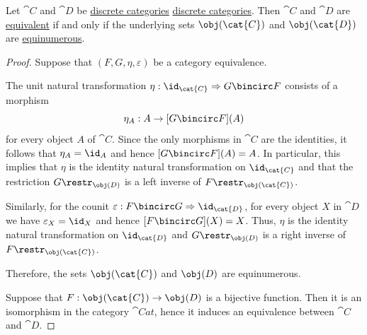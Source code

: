 \begin{proposition}\label{thm:discrete_category_equivalence}
  Let \( \cat{C} \) and \( \cat{D} \) be \hyperref[def:small_category]{discrete categories} \hyperref[def:discrete_category]{discrete categories}. Then \( \cat{C} \) and \( \cat{D} \) are \hyperref[def:category_equivalence]{equivalent} if and only if the underlying sets \( \obj(\cat{C}) \) and \( \obj(\cat{D}) \) are \hyperref[def:equinumerosity]{equinumerous}.
\end{proposition}
\begin{proof}
  \SufficiencySubProof Suppose that \( (F, G, \eta, \varepsilon) \) be a category equivalence.

  The unit natural transformation \( \eta: \id_{\cat{C}} \Rightarrow G \bincirc F \) consists of a morphism
  \begin{equation*}
    \eta_A: A \to [G \bincirc F](A)
  \end{equation*}
  for every object \( A \) of \( \cat{C} \). Since the only morphisms in \( \cat{C} \) are the identities, it follows that \( \eta_A = \id_A \) and hence \( [G \bincirc F](A) = A \). In particular, this implies that \( \eta \) is the identity natural transformation on \( \id_{\cat{C}} \) and that the restriction \( G\restr_{\obj(D)} \) is a left inverse of \( F\restr_{\obj(\cat{C})} \).

  Similarly, for the counit \( \varepsilon: F \bincirc G \Rightarrow \id_{\cat{D}} \), for every object \( X \) in \( \cat{D} \) we have \( \varepsilon_X = \id_X \) and hence \( [F \bincirc G](X) = X \). Thus, \( \eta \) is the identity natural transformation on \( \id_{\cat{D}} \) and \( G\restr_{\obj(D)} \) is a right inverse of \( F\restr_{\obj(\cat{C})} \).

  Therefore, the sets \( \obj(\cat{C}) \) and \( \obj(D) \) are equinumerous.

  \NecessitySubProof Suppose that \( F: \obj(\cat{C}) \to \obj(D) \) is a bijective function. Then it is an isomorphism in the category \( \cat{Cat} \), hence it induces an equivalence between \( \cat{C} \) and \( \cat{D} \).
\end{proof}

